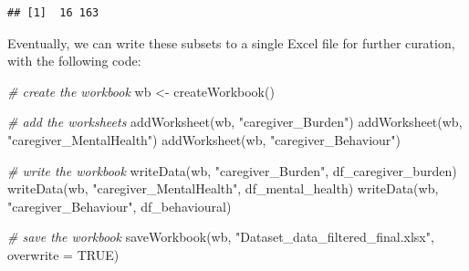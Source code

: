 \documentclass[
]{article}
\newenvironment{Shaded}{\begin{snugshade}}{\end{snugshade}}
\newcommand{\AttributeTok}[1]{\textcolor[rgb]{0.77,0.63,0.00}{#1}}
\newcommand{\CommentTok}[1]{\textcolor[rgb]{0.56,0.35,0.01}{\textit{#1}}}
\newcommand{\ConstantTok}[1]{\textcolor[rgb]{0.00,0.00,0.00}{#1}}
\newcommand{\FunctionTok}[1]{\textcolor[rgb]{0.00,0.00,0.00}{#1}}
\newcommand{\NormalTok}[1]{#1}
\newcommand{\OtherTok}[1]{\textcolor[rgb]{0.56,0.35,0.01}{#1}}
\newcommand{\SpecialCharTok}[1]{\textcolor[rgb]{0.00,0.00,0.00}{#1}}
\newcommand{\StringTok}[1]{\textcolor[rgb]{0.31,0.60,0.02}{#1}}
\begin{document}
\begin{Shaded}
\end{Shaded}

\begin{verbatim}
## [1]  16 163
\end{verbatim}

Eventually, we can write these subsets to a single Excel file for
further curation, with the following code:

\begin{Shaded}
\begin{Highlighting}[]
\CommentTok{\# create the workbook}
\NormalTok{wb }\OtherTok{\textless{}{-}} \FunctionTok{createWorkbook}\NormalTok{()}

\CommentTok{\# add the worksheets}
\FunctionTok{addWorksheet}\NormalTok{(wb, }\StringTok{"caregiver\_Burden"}\NormalTok{)}
\FunctionTok{addWorksheet}\NormalTok{(wb, }\StringTok{"caregiver\_MentalHealth"}\NormalTok{)}
\FunctionTok{addWorksheet}\NormalTok{(wb, }\StringTok{"caregiver\_Behaviour"}\NormalTok{)}

\CommentTok{\# write the workbook}
\FunctionTok{writeData}\NormalTok{(wb, }\StringTok{"caregiver\_Burden"}\NormalTok{, df\_caregiver\_burden)}
\FunctionTok{writeData}\NormalTok{(wb, }\StringTok{"caregiver\_MentalHealth"}\NormalTok{, df\_mental\_health)}
\FunctionTok{writeData}\NormalTok{(wb, }\StringTok{"caregiver\_Behaviour"}\NormalTok{, df\_behavioural)}

\CommentTok{\# save the workbook}
\FunctionTok{saveWorkbook}\NormalTok{(wb, }\StringTok{"Dataset\_data\_filtered\_final.xlsx"}\NormalTok{, }\AttributeTok{overwrite =} \ConstantTok{TRUE}\NormalTok{)}
\end{Highlighting}
\end{Shaded}
\end{document}
